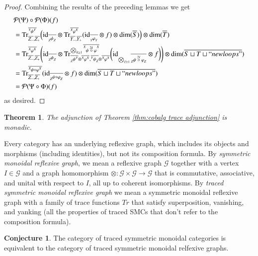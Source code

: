 \documentclass{amsart}
\def\tn{\textnormal}
\def\mc{\mathcal}
\def\dim{\tn{dim}}
\def\Trace{\tn{Tr}}
\def\to{\rightarrow}
\def\taking{\colon}
\def\ol{\overline}
\def\id{\tn{id}}
\def\mcG{\mc{G}}
\def\mcP{\mc{P}}
\newcommand{\inp}[1]{{#1_-}}
\newcommand{\outp}[1]{{#1_+}}
\newcommand{\feeddd}[3]{{\tensor*[^{#2}_{\color{white}{!}}]{{#1}}{^{#3}}}}%
\newcommand{\feeddc}[3]{{\tensor*[^{#2}]{{#1}}{_{#3}}}}
\newcommand{\feedcd}[3]{{\tensor*[_{#2}]{{#1}}{^{#3}}}}
\newcommand{\feedcc}[3]{{\tensor*[^{\color{white}{!}}_{#2}]{{#1}}{_{#3}}}}
\newtheorem{theorem}[subsection]{Theorem}
\theoremstyle{remark}
\theoremstyle{definition}
\newtheorem{conjecture}[subsection]{Conjecture}
\begin{document}
\begin{proof}
Combining the results of the preceding lemmas we get
\begin{align*}
&\mcP(\Psi)\circ\mcP(\Phi)(f)\\
&=
\Trace^{\ol{\feeddd{\psi}{Y}{Y}}}_{\ol{Z_-},\ol{Z_+}}
\Big(
\id_{\ol{\feedcc{\psi}{Z}{Z}}}\otimes
\Trace^{\ol{\feeddd{\varphi}{X}{X}}}_{\ol{Y_-},\ol{Y_+}}(\id_{\ol{\feedcc{\varphi}{Y}{Y}}}\otimes f)\otimes\dim(\ol{S})
\Big)
\otimes\dim(\ol{T})\\
&=\Trace^{\ol{\feeddd{\varphi}{X}{X}}}_{\ol{\inp{Z}},\ol{\outp{Z}}}
\Bigg(
\id_{\ol{\feedcc{\psi}{Z}{Z}}}\otimes\Trace^{\bigotimes_{k\ge1}\ol{\feeddd{\psi\;\accentset{2k}{\circ}\;\varphi}{X}{X}}
}_{\ol{\feedcd{\psi}{Z}{Y}}\otimes\ol{\feeddd{\varphi}{X}{X}},\ol{\feeddc{\psi}{Y}{Z}}\otimes\ol{\feeddd{\varphi}{X}{X}}}
\bigg(
\id_{\bigotimes_{\ell\ge1}\ol{\feedcc{\psi\;\accentset{2\ell}{\circ}\;\varphi}{Z}{Z}}
}\otimes f
\bigg)
\Bigg)\otimes\dim(\ol{S\sqcup T\sqcup ``newloops"})\\
&=\Trace^{\ol{\feeddd{\psi\circ\varphi}{X}{X}}}_{\ol{Z_-},\ol{Z_+}}(\id_{\ol{\feedcc{\psi\circ\varphi}{Z}{Z}}}\otimes f)\otimes\dim(\ol{S\sqcup T\sqcup ``newloops"})\\
&=\mcP(\Psi\circ\Phi)(f)
\end{align*}
as desired.
\end{proof}

\begin{theorem}

The adjunction of Theorem \ref{thm:cobalg trace adjunction} is monadic. 

\end{theorem}

Every category has an underlying reflexive graph, which includes its objects and morphisms (including identities), but not its composition formula. By {\em symmetric monoidal reflexive graph}, we mean a reflexive graph $\mcG$ together with a vertex $I\in \mcG$ and a graph homomorphism $\otimes\taking\mcG\times\mcG\to\mcG$ that is commutative, associative, and unital with respect to $I$, all up to coherent isomorphisms. By {\em traced symmetric monoidal reflexive graph} we mean a symmetric monoidal reflexive graph with a family of trace functions $Tr$ that satisfy superposition, vanishing, and yanking (all the properties of traced SMCs that don't refer to the composition formula).

\begin{conjecture}
The category of traced symmetric monoidal categories is equivalent to the category of traced symmetric monoidal relfexive graphs.
\end{conjecture}
\end{document}
